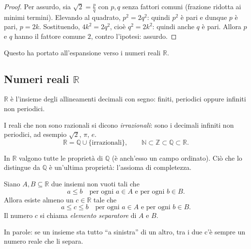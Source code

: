 \documentclass[11pt,a4paper]{article}
\begin{document}
\begin{proof}
Per assurdo, sia $\sqrt{2} = \frac{p}{q}$ con $p, q$ senza fattori comuni
(frazione ridotta ai minimi termini). Elevando al quadrato,
$p^2 = 2q^2$: quindi $p^2$ è pari e dunque $p$ è pari, $p = 2k$.
Sostituendo, $4k^2 = 2q^2$, cioè $q^2 = 2k^2$: quindi anche $q$ è pari.
Allora $p$ e $q$ hanno il fattore comune $2$, contro l'ipotesi: assurdo.
\end{proof}

Questo ha portato all'espansione verso i numeri reali $\mathbb{R}$.


\subsection{Numeri reali $\mathbb{R}$}

\begin{definizione}
$\mathbb{R}$ è l'insieme degli allineamenti decimali con segno:
finiti, periodici oppure infiniti non periodici.
\end{definizione}

I reali che non sono razionali si dicono \emph{irrazionali}: sono i
decimali infiniti non periodici, ad esempio $\sqrt{2}$, $\pi$, $e$.
\[
\mathbb{R} = \mathbb{Q} \cup \{\text{irrazionali}\}, \qquad
\mathbb{N} \subset \mathbb{Z} \subset \mathbb{Q} \subset \mathbb{R}.
\]

In $\mathbb{R}$ valgono tutte le proprietà di $\mathbb{Q}$ (è anch'esso un
campo ordinato). Ciò che lo distingue da $\mathbb{Q}$ è un'ultima
proprietà: l'assioma di completezza.

\begin{assioma}
Siano $A, B \subseteq \mathbb{R}$ due insiemi non vuoti tali che
\[
a \leq b \quad \text{per ogni } a \in A \text{ e per ogni } b \in B.
\]
Allora esiste almeno un $c \in \mathbb{R}$ tale che
\[
a \leq c \leq b \quad \text{per ogni } a \in A \text{ e per ogni } b \in B.
\]
Il numero $c$ si chiama \emph{elemento separatore} di $A$ e $B$.
\end{assioma}

In parole: se un insieme sta tutto ``a sinistra'' di un altro, tra i due
c'è sempre un numero reale che li separa.

\begin{center}
\end{center}
\end{document}
